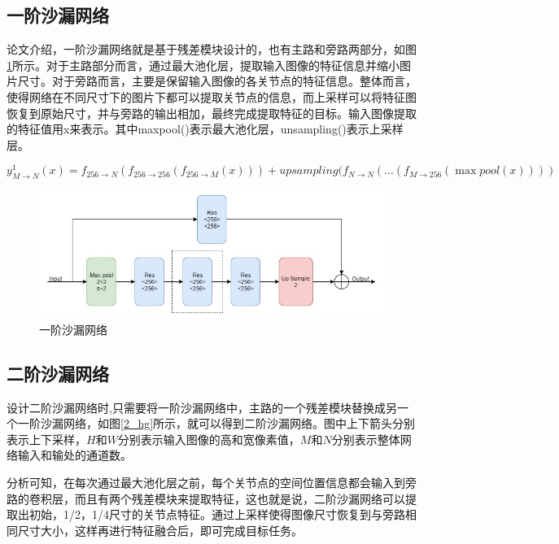 \subsection{一阶沙漏网络}

论文介绍，一阶沙漏网络就是基于残差模块设计的，也有主路和旁路两部分，如图\ref{1_hg}所示。对于主路部分而言，通过最大池化层，提取输入图像的特征信息并缩小图片尺寸。对于旁路而言，主要是保留输入图像的各关节点的特征信息。整体而言，使得网络在不同尺寸下的图片下都可以提取关节点的信息，而上采样可以将特征图恢复到原始尺寸，并与旁路的输出相加，最终完成提取特征的目标。输入图像提取的特征值用x来表示。其中maxpool()表示最大池化层，unsampling()表示上采样层。

\begin{equation}
y_{M \to N}^1(x) = {f_{256 \to N}}({f_{256 \to 256}}({f_{256 \to M}}(x))) + upsampling({f_{N \to N}}(...({f_{M \to 256}}(\max pool(x))))
\end{equation}

\begin{figure}[h]
	\includegraphics[width=\textwidth]{pic/1_k_hourglass.jpg}
	\caption{一阶沙漏网络}
	\label{1_hg}
\end{figure}

\subsection{二阶沙漏网络}

设计二阶沙漏网络时,只需要将一阶沙漏网络中，主路的一个残差模块替换成另一个一阶沙漏网络，如图\ref{2_hg}所示，就可以得到二阶沙漏网络。图中上下箭头分别表示上下采样，$H$和$W$分别表示输入图像的高和宽像素值，$M$和$N$分别表示整体网络输入和输处的通道数。

分析可知，在每次通过最大池化层之前，每个关节点的空间位置信息都会输入到旁路的卷积层，而且有两个残差模块来提取特征，这也就是说，二阶沙漏网络可以提取出初始，1/2，1/4尺寸的关节点特征。通过上采样使得图像尺寸恢复到与旁路相同尺寸大小，这样再进行特征融合后，即可完成目标任务。

